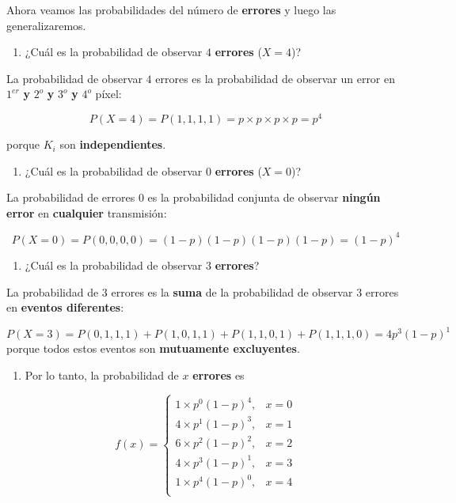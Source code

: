 \documentclass[
]{book}
\providecommand{\tightlist}{%
  \setlength{\itemsep}{0pt}\setlength{\parskip}{0pt}}
\begin{document}
Ahora veamos las probabilidades del número de \textbf{errores} y luego las generalizaremos.

\begin{enumerate}
\def\labelenumi{\arabic{enumi})}
\tightlist
\item
  ¿Cuál es la probabilidad de observar \(4\) \textbf{errores} (\(X=4\))?
\end{enumerate}

La probabilidad de observar \(4\) errores es la probabilidad de observar un error en \(1^{er}\) \textbf{y} \(2^{o}\) \textbf{y} \(3^{o}\) \textbf{y} \(4 ^{o}\) píxel:

\[P(X=4)=P(1,1,1,1)=p\times p\times p\times p=p^4\]

porque \(K_i\) son \textbf{independientes}.

\begin{enumerate}
\def\labelenumi{\arabic{enumi})}
\setcounter{enumi}{1}
\tightlist
\item
  ¿Cuál es la probabilidad de observar \(0\) \textbf{errores} (\(X=0\))?
\end{enumerate}

La probabilidad de errores \(0\) es la probabilidad conjunta de observar \textbf{ningún error} en \textbf{cualquier} transmisión:

\[P(X=0)=P(0,0,0,0)=(1-p)(1-p)(1-p)(1-p)=(1-p)^4\]

\begin{enumerate}
\def\labelenumi{\arabic{enumi})}
\setcounter{enumi}{2}
\tightlist
\item
  ¿Cuál es la probabilidad de observar \(3\) \textbf{errores}?
\end{enumerate}

La probabilidad de \(3\) errores es la \textbf{suma} de la probabilidad de observar \(3\) errores en \textbf{eventos diferentes}:

\[P(X=3)=P(0,1,1,1)+P(1,0,1,1)+P(1,1,0,1)+P(1,1,1, 0)=4p^3(1-p)^1\]
porque todos estos eventos son \textbf{mutuamente excluyentes}.

\begin{enumerate}
\def\labelenumi{\arabic{enumi})}
\setcounter{enumi}{3}
\tightlist
\item
  Por lo tanto, la probabilidad de \(x\) \textbf{errores} es
\end{enumerate}

\[
    f(x)= 
\begin{cases}
    1\times p^0(1-p)^4,&  x=0 \\
    4\times p^1(1-p)^3,&  x=1 \\
    6\times p^2(1-p)^2,&  x=2 \\
    4\times p^3(1-p)^1,&  x=3 \\
    1\times p^4(1-p)^0,&  x=4 \\
\end{cases}
\]
\end{document}

